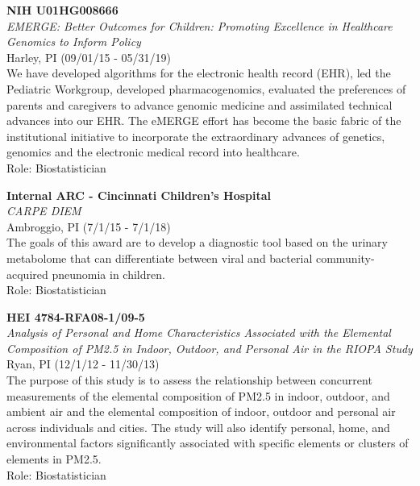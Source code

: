 \documentclass{nihbiosketch}
\begin{document}
\bigskip

\textbf{NIH U01HG008666}\\
\emph{EMERGE: Better Outcomes for Children: Promoting Excellence in
	Healthcare Genomics to Inform Policy}\\
Harley, PI (09/01/15 - 05/31/19)\\
We have developed algorithms for the electronic health record (EHR), led
the Pediatric Workgroup, developed pharmacogenomics, evaluated the
preferences of parents and caregivers to advance genomic medicine and
assimilated technical advances into our EHR. The eMERGE effort has
become the basic fabric of the institutional initiative to incorporate
the extraordinary advances of genetics, genomics and the electronic
medical record into healthcare.\\
Role: Biostatistician

\bigskip

\textbf{Internal ARC - Cincinnati Children's Hospital}\\
\emph{CARPE DIEM}\\
Ambroggio, PI (7/1/15 - 7/1/18)\\
The goals of this award are to develop a diagnostic tool based on the
urinary metabolome that can differentiate between viral and bacterial
community-acquired pneunomia in children.\\
Role: Biostatistician

\bigskip

\textbf{HEI 4784-RFA08-1/09-5}\\
\emph{Analysis of Personal and Home Characteristics Associated with the
	Elemental Composition of PM2.5 in Indoor, Outdoor, and Personal Air in
	the RIOPA Study}\\
Ryan, PI (12/1/12 - 11/30/13)\\
The purpose of this study is to assess the relationship between
concurrent measurements of the elemental composition of PM2.5 in indoor,
outdoor, and ambient air and the elemental composition of indoor,
outdoor and personal air across individuals and cities. The study will
also identify personal, home, and environmental factors significantly
associated with specific elements or clusters of elements in PM2.5.\\
Role: Biostatistician
\end{document}
